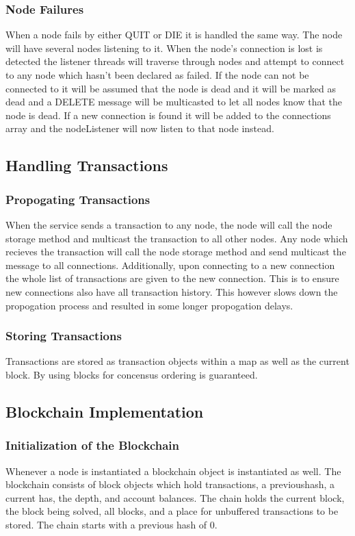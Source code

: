 \documentclass{article}
\begin{document}
        \subsubsection{Node Failures}
                When a node fails by either QUIT or DIE it is handled the same way. The node will have several nodes listening to it. When the node's connection is lost is detected the listener threads will traverse through nodes and attempt to connect to any node which hasn't been declared as failed. If the node can not be connected to it will be assumed that the node is dead and it will be marked as dead and a DELETE message will be multicasted to let all nodes know that the node is dead. If a new connection is found it will be added to the connections array and the nodeListener will now listen to that node instead.
    \subsection{Handling Transactions}
        \subsubsection{Propogating Transactions}
                When the service sends a transaction to any node, the node will call the node storage method and multicast the transaction to all other nodes. Any node which recieves the transaction will call the node storage method and send multicast the message to all connections. Additionally, upon connecting to a new connection the whole list of transactions are given to the new connection. This is to ensure new connections also have all transaction history. This however slows down the propogation process and resulted in some longer propogation delays.
        \subsubsection{Storing Transactions}
                Transactions are stored as transaction objects within a map as well as the current block. By using blocks for concensus ordering is guaranteed.
    \subsection{Blockchain Implementation}
        \subsubsection{Initialization of the Blockchain}
                Whenever a node is instantiated a blockchain object is instantiated as well. The blockchain consists of block objects which hold transactions, a previoushash, a current has, the depth, and account balances. The chain holds the current block, the block being solved, all blocks, and a place for unbuffered transactions to be stored. The chain starts with a previous hash of $0$. 
\end{document}
